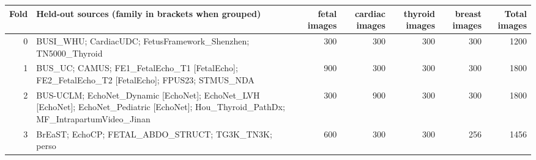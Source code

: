 \begin{tabular}{rlrrrrr}
\toprule
Fold & Held-out sources (family in brackets when grouped) & fetal images & cardiac images & thyroid images & breast images & Total images \\
\midrule
0 & BUSI_WHU; CardiacUDC; FetusFramework_Shenzhen; TN5000_Thyroid & 300 & 300 & 300 & 300 & 1200 \\
1 & BUS_UC; CAMUS; FE1_FetalEcho_T1 [FetalEcho]; FE2_FetalEcho_T2 [FetalEcho]; FPUS23; STMUS_NDA & 900 & 300 & 300 & 300 & 1800 \\
2 & BUS-UCLM; EchoNet_Dynamic [EchoNet]; EchoNet_LVH [EchoNet]; EchoNet_Pediatric [EchoNet]; Hou_Thyroid_PathDx; MF_IntrapartumVideo_Jinan & 300 & 900 & 300 & 300 & 1800 \\
3 & BrEaST; EchoCP; FETAL_ABDO_STRUCT; TG3K_TN3K; perso & 600 & 300 & 300 & 256 & 1456 \\
\bottomrule
\end{tabular}
